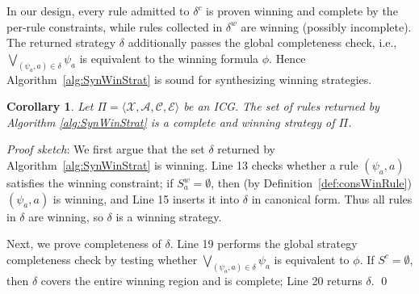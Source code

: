 \documentclass[review]{elsarticle}
\newcommand{\set}[1]{\{ #1 \}}
\newcommand{\tuple}[1]{\langle {#1} \rangle}
\newcommand{\statevar}{\mathcal{X}}
\newcommand{\act}{\mathcal{A}}
\newcommand{\constraint}{\mathcal{C}}
\newcommand{\estate}{\mathcal{E}}
\newenvironment{proofsketch}{\textit{Proof sketch}:}{\qed}
\newtheorem{corollary}{Corollary}
\begin{document}

In our design, every rule admitted to $\delta^c$ is proven winning and complete by the per-rule constraints, while rules collected in $\delta^w$ are winning (possibly incomplete). The returned strategy $\delta$ additionally passes the global completeness check, i.e., $\bigvee_{(\psi_a, a) \in \delta} \psi_a$ is equivalent to the winning formula $\phi$. Hence Algorithm~\ref{alg:SynWinStrat} is sound for synthesizing winning strategies.

\begin{corollary} \label{cor:winStr}
	Let $\Pi = \tuple{\statevar, \act, \constraint, \estate}$ be an ICG.
	The set of rules returned by Algorithm \ref{alg:SynWinStrat} is a complete and winning strategy of $\Pi$.
\end{corollary}

\begin{proofsketch}
 We first argue that the set $\delta$ returned by Algorithm~\ref{alg:SynWinStrat} is winning. Line 13 checks whether a rule $(\psi_a,a)$ satisfies the winning constraint; if $S^w_a = \emptyset$, then (by Definition~\ref{def:consWinRule}) $(\psi_a,a)$ is winning, and Line 15 inserts it into $\delta$ in canonical form. Thus all rules in $\delta$ are winning, so $\delta$ is a winning strategy.

 Next, we prove completeness of $\delta$. Line 19 performs the global strategy completeness check by testing whether $\bigvee_{(\psi_a,a)\in\delta}\psi_a$ is equivalent to $\phi$. If $S^c = \emptyset$, then $\delta$ covers the entire winning region and is complete; Line 20 returns $\delta$.
\end{proofsketch}
\end{document}
